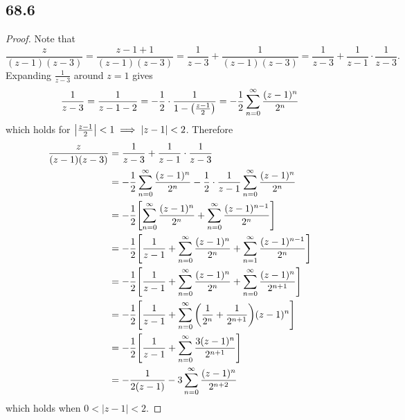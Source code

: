 \documentclass[12pt]{extarticle}
\begin{document}
\subsection*{68.6}
\begin{proof}
    Note that
    \[
        \frac{z}{(z-1)(z-3)} = \frac{z - 1 + 1}{(z-1)(z-3)} = \frac{1}{z-3} + \frac{1}{(z-1)(z-3)} = \frac{1}{z-3} + \frac{1}{z-1} \cdot \frac{1}{z-3}
    .\]
    Expanding $\frac{1}{z-3}$ around $z = 1$ gives
    \[
        \frac{1}{z-3} = \frac{1}{z - 1 - 2} = -\frac{1}{2} \cdot \frac{1}{1 - \qty(\frac{z-1}{2})} = -\frac{1}{2} \sum_{n=0}^\infty \frac{(z-1)^n}{2^n} 
    \]
    which holds for $\qty|\frac{z-1}{2}| < 1 \implies |z-1| < 2$. Therefore
    \begin{align*}
        \frac{z}{(z-1)(z-3)} &= \frac{1}{z-3} + \frac{1}{z-1} \cdot \frac{1}{z-3} \\
        &= -\frac{1}{2} \sum_{n=0}^\infty \frac{(z-1)^n}{2^n} - \frac{1}{2} \cdot \frac{1}{z-1} \sum_{n=0}^\infty \frac{(z-1)^n}{2^n} \\
        &= -\frac{1}{2} \qty[
        \sum_{n=0}^\infty \frac{(z-1)^n}{2^n} + \sum_{n=0}^\infty \frac{(z-1)^{n-1}}{2^n}
        ] \\
        &= -\frac{1}{2} \qty[
        \frac{1}{z-1} + \sum_{n=0}^\infty \frac{(z-1)^n}{2^n} + \sum_{n=1}^\infty \frac{(z-1)^{n-1}}{2^n}
        ] \\
        &= -\frac{1}{2} \qty[
        \frac{1}{z-1} + \sum_{n=0}^\infty \frac{(z-1)^n}{2^n} + \sum_{n=0}^\infty \frac{(z-1)^{n}}{2^{n+1}}
        ] \\ 
        &= -\frac{1}{2} \qty[
        \frac{1}{z-1} + \sum_{n=0}^\infty \qty(\frac{1}{2^n} + \frac{1}{2^{n+1}})(z-1)^n
        ] \\
        &= -\frac{1}{2} \qty[
        \frac{1}{z-1} + \sum_{n=0}^\infty \frac{3(z-1)^n}{2^{n+1}}
        ] \\
        &= -\frac{1}{2(z-1)} - 3\sum_{n=0}^\infty \frac{(z-1)^n}{2^{n+2}}
    \end{align*}
    which holds when $0 < |z-1| < 2$.
\end{proof}
\end{document}
